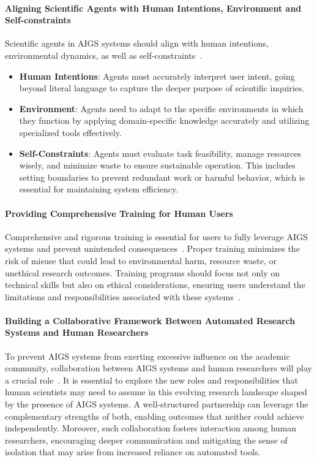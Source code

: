 \documentclass{article} %
\newcommand{\AIGS}{AIGS\xspace}
\begin{document}
\paragraph{Aligning Scientific Agents with Human Intentions, Environment and Self-constraints}
Scientific agents in \AIGS systems should align with human intentions, environmental dynamics, as well as self-constraints~\citep{yang2024towards}.
\begin{itemize}
    \item \textbf{Human Intentions}: Agents must accurately interpret user intent, going beyond literal language to capture the deeper purpose of scientific inquiries.
    \item \textbf{Environment}: Agents need to adapt to the specific environments in which they function by applying domain-specific knowledge accurately and utilizing specialized tools effectively.
    \item \textbf{Self-Constraints}: Agents must evaluate task feasibility, manage resources wisely, and minimize waste to ensure sustainable operation. This includes setting boundaries to prevent redundant work or harmful behavior, which is essential for maintaining system efficiency.
\end{itemize}

\paragraph{Providing Comprehensive Training for Human Users}
Comprehensive and rigorous training is essential for users to fully leverage \AIGS systems and prevent unintended consequences~\citep{aisdpi}.
Proper training minimizes the risk of misuse that could lead to environmental harm, resource waste, or unethical research outcomes.
Training programs should focus not only on technical skills but also on ethical considerations, ensuring users understand the limitations and responsibilities associated with these systems~\citep{tang2024prioritizing}.

\paragraph{Building a Collaborative Framework Between Automated Research Systems and Human Researchers}
To prevent \AIGS systems from exerting excessive influence on the academic community, collaboration between \AIGS systems and human researchers will play a crucial role~\citep{si2024can, hu2024nova}.
It is essential to explore the new roles and responsibilities that human scientists may need to assume in this evolving research landscape shaped by the presence of \AIGS systems.
A well-structured partnership can leverage the complementary strengths of both, enabling outcomes that neither could achieve independently.
Moreover, such collaboration fosters interaction among human researchers, encouraging deeper communication and mitigating the sense of isolation that may arise from increased reliance on automated tools.
\end{document}
